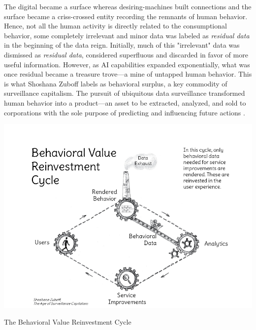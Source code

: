 The digital became a surface whereas desiring-machines built connections and the
surface became a criss-crossed entity 
 recording the remnants of human behavior. Hence, not all the human activity is
directly related to the consumptional behavior, some completely irrelevant and
minor data was labeled as \textit{residual data} in the beginning of the data
reign. Initially, much of this "irrelevant" data was dismissed as \textit{residual data}, considered superfluous and discarded in favor of more useful information. However, as AI capabilities expanded exponentially, what was once residual became a treasure trove—a mine of untapped human behavior. This is what Shoshana Zuboff \parencite*[74-82]{zuboff2019} labels as behavioral surplus, a key commodity of surveillance capitalism. The pursuit of ubiquitous data surveillance transformed human behavior into a product—an asset to be extracted, analyzed, and sold to corporations with the sole purpose of predicting and influencing future actions \parencite[71]{zuboff2019}.

\begin{marginfigure} \includegraphics[scale=0.2]{zuboff.png} \caption{The Behavioral Value Reinvestment Cycle \parencite[72]{zuboff2019}}\ \label{fig
} \end{marginfigure}

